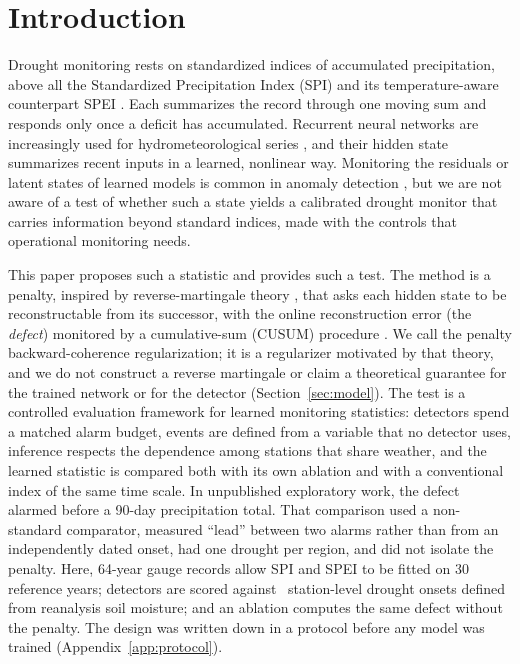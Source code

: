 \documentclass[pdflatex,sn-mathphys-ay]{sn-jnl}
\theoremstyle{thmstyletwo}
\begin{document}

\maketitle

\section{Introduction}\label{sec:intro}
Drought monitoring rests on standardized indices of accumulated precipitation, above all the
Standardized Precipitation Index (SPI) and its temperature-aware counterpart SPEI
\citep{mckee1993,wmo2012,vicenteserrano2010,mishra2010,hao2017}. Each summarizes the record through one
moving sum and responds only once a deficit has accumulated. Recurrent neural networks
\citep{hochreiter1997} are increasingly used for hydrometeorological series \citep{kratzert2019}, and
their hidden state summarizes recent inputs in a learned, nonlinear way. Monitoring the residuals or
latent states of learned models is common in anomaly detection \citep{hundman2018,gama2014}, but we are
not aware of a test of whether such a state yields a calibrated drought monitor that carries
information beyond standard indices, made with the controls that operational monitoring needs.

This paper proposes such a statistic and provides such a test. The method is a penalty, inspired by
reverse-martingale theory \citep{doob1953}, that asks each hidden state to be reconstructable from its
successor, with the online reconstruction error (the \emph{defect}) monitored by a cumulative-sum (CUSUM)
procedure \citep{page1954,lorden1971,moustakides1986,tartakovsky2014}. We call the penalty
backward-coherence regularization; it is a regularizer motivated by that theory, and we do not construct a
reverse martingale or claim a theoretical guarantee for the trained network or for the detector
(Section~\ref{sec:model}). The test is a controlled evaluation framework for learned monitoring
statistics: detectors spend a matched alarm budget, events are defined from a variable that no detector
uses, inference respects the dependence among stations that share weather, and the learned statistic is
compared both with its own ablation and with a conventional index of the same time scale. In unpublished exploratory work, the defect alarmed before a 90-day
precipitation total. That comparison used a non-standard comparator, measured ``lead'' between two alarms
rather than from an independently dated onset, had one drought per region, and did not isolate the
penalty. Here, 64-year gauge records allow SPI and SPEI to be fitted on 30 reference years; detectors are
scored against \nevall\ station-level drought onsets defined from reanalysis soil moisture; and an
ablation computes the same defect without the penalty. The design was written down in a protocol before
any model was trained (Appendix~\ref{app:protocol}).
\end{document}
